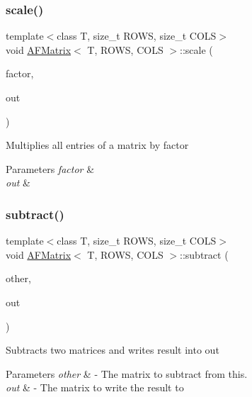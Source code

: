 \subsubsection{\texorpdfstring{scale()}{scale()}}
{\footnotesize\ttfamily template$<$class T, size\+\_\+t R\+O\+WS, size\+\_\+t C\+O\+LS$>$ \\
void \hyperlink{class_a_f_matrix}{A\+F\+Matrix}$<$ T, R\+O\+WS, C\+O\+LS $>$\+::scale (\begin{DoxyParamCaption}\item[{double}]{factor,  }\item[{\hyperlink{class_a_f_matrix}{A\+F\+Matrix}$<$ T, R\+O\+WS, C\+O\+LS $>$ $\ast$}]{out }\end{DoxyParamCaption})\hspace{0.3cm}{\ttfamily [inline]}}

Multiplies all entries of a matrix by {\ttfamily factor} 
\begin{DoxyParams}{Parameters}
{\em factor} & \\
\hline
{\em out} & \\
\hline
\end{DoxyParams}
\mbox{\label{class_a_f_matrix_a85ffed84dc6b1acb24a2c73e54511dff}} 
\subsubsection{\texorpdfstring{subtract()}{subtract()}}
{\footnotesize\ttfamily template$<$class T, size\+\_\+t R\+O\+WS, size\+\_\+t C\+O\+LS$>$ \\
void \hyperlink{class_a_f_matrix}{A\+F\+Matrix}$<$ T, R\+O\+WS, C\+O\+LS $>$\+::subtract (\begin{DoxyParamCaption}\item[{\hyperlink{class_a_f_matrix}{A\+F\+Matrix}$<$ T, R\+O\+WS, C\+O\+LS $>$ $\ast$}]{other,  }\item[{\hyperlink{class_a_f_matrix}{A\+F\+Matrix}$<$ T, R\+O\+WS, C\+O\+LS $>$ $\ast$}]{out }\end{DoxyParamCaption})\hspace{0.3cm}{\ttfamily [inline]}}

Subtracts two matrices and writes result into {\ttfamily out} 
\begin{DoxyParams}{Parameters}
{\em other} & -\/ The matrix to subtract from {\ttfamily this}. \\
\hline
{\em out} & -\/ The matrix to write the result to \\
\hline
\end{DoxyParams}
\mbox{\label{class_a_f_matrix_a7e3659073ff6da5ffd02de48156decf5}} 
